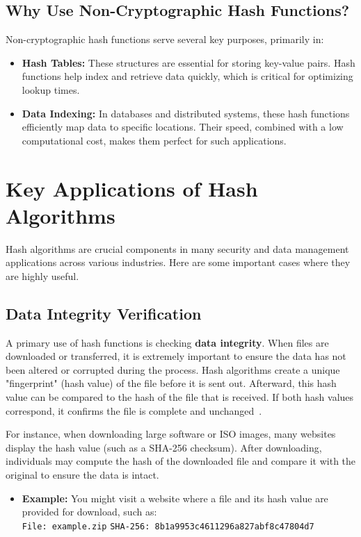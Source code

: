 \documentclass[11pt,a4paper]{article}
\begin{document}
    \subsection*{Why Use Non-Cryptographic Hash Functions?}
    Non-cryptographic hash functions serve several key purposes, primarily in:
        \begin{itemize}
            \item \textbf{Hash Tables:} These structures are essential for storing key-value pairs. Hash functions help index and retrieve data quickly, which is critical for optimizing lookup times.

            \item \textbf{Data Indexing:} In databases and distributed systems, these hash functions efficiently map data to specific locations. Their speed, combined with a low computational cost, makes them perfect for such applications.

        \end{itemize}

\section*{Key Applications of Hash Algorithms}
Hash algorithms are crucial components in many security and data management applications across various industries. Here are some important cases where they are highly useful.

        \subsection*{Data Integrity Verification}
        A primary use of hash functions is checking \textbf{data integrity}. When files are downloaded or transferred, it is extremely important to ensure the data has not been altered or corrupted during the process. Hash algorithms create a unique "fingerprint" (hash value) of the file before it is sent out. Afterward, this hash value can be compared to the hash of the file that is received. If both hash values correspond, it confirms the file is complete and unchanged~\cite{Integrity}.

        For instance, when downloading large software or ISO images, many websites display the hash value (such as a SHA-256 checksum). After downloading, individuals may compute the hash of the downloaded file and compare it with the original to ensure the data is intact.

        \begin{itemize}
            \item \textbf{Example:} You might visit a website where a file and its hash value are provided for download, such as:
            \\[1em]
            \lstinline{File: example.zip}
            \newline
            \lstinline{SHA-256: 8b1a9953c4611296a827abf8c47804d7}

        \end{itemize}
\end{document}

